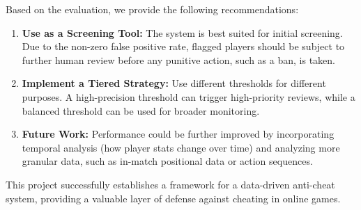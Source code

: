 \documentclass{article}
\begin{document}
Based on the evaluation, we provide the following recommendations:
\begin{enumerate}
    \item \textbf{Use as a Screening Tool:} The system is best suited for initial screening. Due to the non-zero false positive rate, flagged players should be subject to further human review before any punitive action, such as a ban, is taken.
    \item \textbf{Implement a Tiered Strategy:} Use different thresholds for different purposes. A high-precision threshold can trigger high-priority reviews, while a balanced threshold can be used for broader monitoring.
    \item \textbf{Future Work:} Performance could be further improved by incorporating temporal analysis (how player stats change over time) and analyzing more granular data, such as in-match positional data or action sequences.
\end{enumerate}

This project successfully establishes a framework for a data-driven anti-cheat system, providing a valuable layer of defense against cheating in online games.
\end{document}
